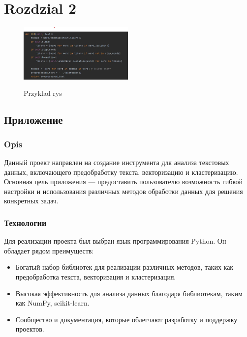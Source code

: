 \chapter{Rozdzial 2}
	
	
	\begin{figure}
		\centering
		\scalebox{0.25} {\includegraphics[width=0.5\textwidth]{./img/rys1.jpg	}}
		\caption{Przyklad rys}
		\label{fig:rys1}
	\end{figure}
		

\section{Приложение}

	\subsection{Opis}
		Данный проект направлен на создание инструмента для анализа текстовых данных, включающего предобработку текста, векторизацию и кластеризацию. Основная цель приложения — предоставить пользователю возможность гибкой настройки и использования различных методов обработки данных для решения конкретных задач.
		
	\subsection{Технологии}
		Для реализации проекта был выбран язык программирования Python. Он обладает рядом преимуществ:
		\begin{itemize}
			\item Богатый набор библиотек для реализации различных методов, таких как предобработка текста, векторизация и кластеризация.
			\item Высокая эффективность для анализа данных благодаря библиотекам, таким как NumPy, scikit-learn.
			\item Сообщество и документация, которые облегчают разработку и поддержку проектов.
		\end{itemize}
		
		
